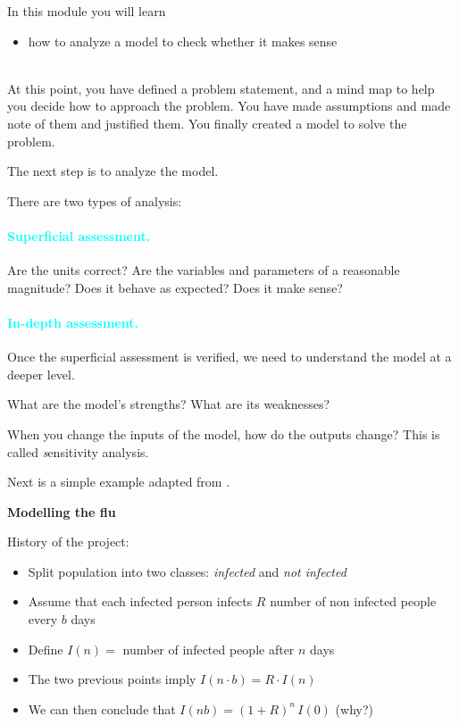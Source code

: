 \begin{siam}

In this module you will learn
\begin{itemize}
	\item how to analyze a model to check whether it makes sense
\end{itemize}

\hfill \\



At this point, you have defined a problem statement, and a mind map to help you decide how to approach the problem. You have made assumptions and made note of them and justified them.
You finally created a model to solve the problem.

The next step is to analyze the model.

There are two types of analysis:


\paragraph{\textcolor{cyan}{\textbf{Superficial assessment.}}} Are the units correct? Are the variables and parameters of a reasonable magnitude? Does it behave as expected? Does it make sense?



\paragraph{\textcolor{cyan}{\textbf{In-depth assessment.}}} Once the superficial assessment is verified, we need to understand the model at a deeper level. 

What are the model's strengths? What are its weaknesses?

When you change the inputs of the model, how do the outputs change? This is called {\emph sensitivity analysis}. 


Next is a simple example adapted from \cite{bliss}.


\begin{annotation}
	\begin{goals}
	\hfill {}	
	\end{goals}
\end{annotation}

\begin{example}\textbf{Modelling the flu}

History of the project:
\begin{itemize}
	\item Split population into two classes: \emph{infected} and \emph{not infected}
	\item Assume that each infected person infects $R$ number of non infected people every $b$ days
	\item Define $I(n) = $ number of infected people after $n$ days
	\item The two previous points imply \quad $I(n \cdot b) = R \cdot I(n)$
	\item We can then conclude that \quad $I(n b) = (1+R)^n \, I(0)$ \hfill (why?) \\
\end{itemize}


\end{example}
\end{siam}
